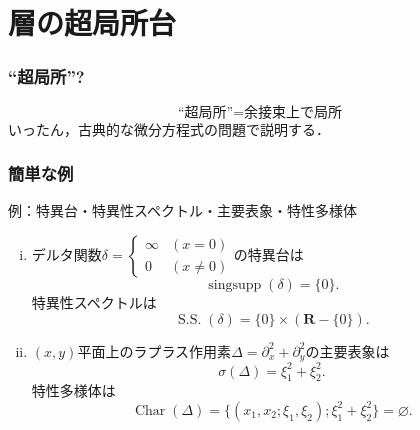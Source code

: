 \documentclass[dvipdfmx,10pt,aspectratio=169,leqno]{beamer}%
\newcommand{\rr}{\mathbf{R}}
\numberwithin{equation}{subsection}
\newcommand{\cotb}[1][]{T^{\ast}{#1}}
\newcommand{\cotz}[1][]{T^{\ast}_{#1}{#1}}
\newcommand{\cotn}[1][]{\dot{T}^{\ast}{#1}}
\theoremstyle{mystyle}
\begin{document}
\section{層の超局所台}
\newcommand{\Char}{\mathop{\mathrm{Char}}\nolimits}
\newcommand{\singsupp}{\mathop{\mathrm{singsupp}}\nolimits}
\newcommand{\SingSpec}{\mathop{\mathrm{S.S.}}\nolimits}

\begin{frame}\frametitle{``超局所''?}
    \[
        \text{``超局所''}=\text{余接束上で局所}
    \]
    いったん，古典的な微分方程式の問題で説明する．
\end{frame}

\begin{frame}\frametitle{簡単な例}
    \begin{exampleblock}{例：特異台・特異性スペクトル・主要表象・特性多様体}
        \begin{enumerate}[(i)]
            \item デルタ関数\(\delta=\begin{cases}
                \infty&(x=0)\\
                0&(x\ne0)
            \end{cases}\)の特異台は\[
                \singsupp(\delta)=\{0\}.
            \]
            特異性スペクトルは\[
                \SingSpec(\delta)=\{0\}\times(\rr-\{0\}).
            \]
            \item \((x,y)\)平面上のラプラス作用素\(
                \Delta=\partial^2_x+\partial^2_y
            \)の主要表象は\[
                \sigma(\Delta)=\xi_1^2+\xi_2^2.
            \]
            特性多様体は\[
                \Char(\Delta)
                =\{(x_1,x_2;\xi_1,\xi_2);\xi_1^2+\xi_2^2\}
                =\varnothing.
            \]
        \end{enumerate}    
    \end{exampleblock}
\end{frame}
\end{document}
